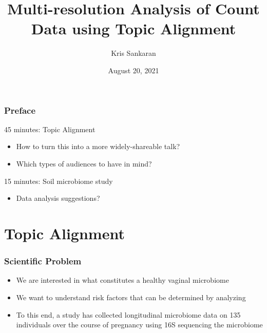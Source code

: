 \documentclass{beamer}
\title{Multi-resolution Analysis of Count Data using Topic Alignment}
\author{Kris Sankaran}
\date{August 20, 2021}
\begin{document}
\frame{\titlepage}

\begin{frame}
  \frametitle{Preface}

  45 minutes: Topic Alignment
  \begin{itemize}
    \item How to turn this into a more widely-shareable talk?
    \item Which types of audiences to have in mind?
  \end{itemize}

  15 minutes: Soil microbiome study
  \begin{itemize}
  \item Data analysis suggestions?
  \end{itemize}
\end{frame}

\section{Topic Alignment}

\begin{frame}
  \frametitle{Scientific Problem}
  \begin{itemize}
  \item We are interested in what constitutes a healthy vaginal microbiome
  \item We want to understand risk factors that can be determined by analyzing
  \item To this end, a study has collected longitudinal microbiome data on 135
  individuals over the course of pregnancy using 16S sequencing
  the microbiome
\end{itemize}
\end{frame}
\end{document}
